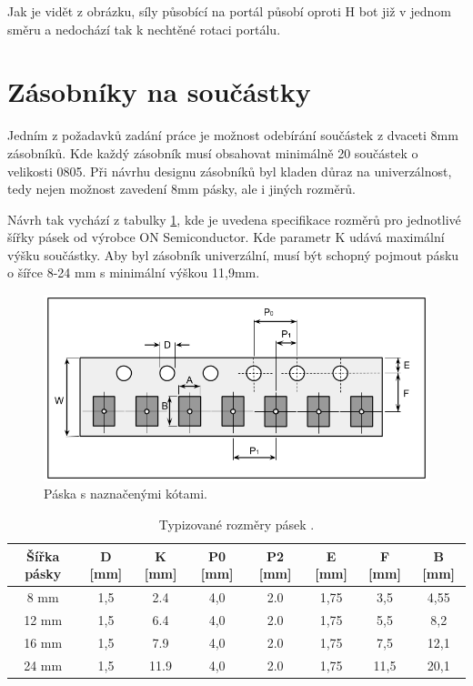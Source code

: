 Jak je vidět z obrázku, síly působící na portál působí oproti H bot již v jednom směru a nedochází tak k nechtěné rotaci portálu. 


\section{Zásobníky na součástky}
Jedním z požadavků zadání práce je možnost odebírání součástek z dvaceti 8mm zásobníků. Kde každý zásobník musí obsahovat minimálně 20 součástek o velikosti 0805. Při návrhu designu zásobníků byl kladen důraz na univerzálnost, tedy nejen možnost zavedení 8mm pásky, ale i jiných rozměrů.

Návrh tak vychází z tabulky \ref{table:pasky}, kde je uvedena specifikace rozměrů pro jednotlivé šířky pásek od výrobce ON Semiconductor. Kde parametr K udává maximální výšku součástky. Aby byl zásobník univerzální, musí být schopný pojmout pásku o šířce 8-24 mm s minimální výškou 11,9mm.

\begin{figure}[h!]
  \centering
    \includegraphics[width=0.8\linewidth]{obrazky/tape.png}%
    \caption{Páska s naznačenými kótami.}
    \label{fig:tape2}
\end{figure}


\begin{table}[h!]
  \caption{Typizované rozměry pásek \cite{onsemi}.}
  \label{table:pasky}
  \begin{center}
  	\small
	  \begin{tabular}{|c|c|c|c|c|c|c|c|}
	    \hline
	    Šířka pásky	& D [mm]	& K [mm]	& P0 [mm]	& P2 [mm]	& E [mm]	& F [mm]	& B [mm]	\\
	    \hline\hline
		8 mm	& 1,5		& 2.4		& 4,0		& 2.0		& 1,75		& 3,5		& 4,55		\\
	    	\hline
		12 mm	& 1,5		& 6.4		& 4,0		& 2.0		& 1,75		& 5,5		& 8,2		\\
	    	\hline
		16 mm	& 1,5		& 7.9		& 4,0		& 2.0		& 1,75		& 7,5		& 12,1		\\
	    	\hline
		24 mm	& 1,5		& 11.9		& 4,0		& 2.0		& 1,75		& 11,5		& 20,1		\\
	    	\hline
	  \end{tabular}
  \end{center}
\end{table}

